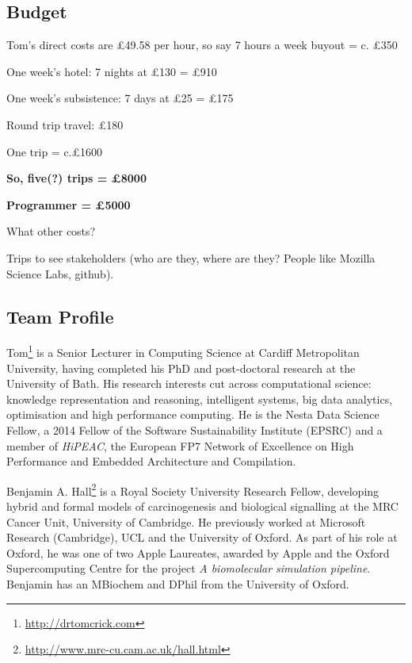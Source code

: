 \documentclass[a4paper,11pt]{article}
\begin{document}



\subsection*{Budget}

Tom's direct costs are \pounds 49.58 per hour, so say 7 hours a week
buyout = c. \pounds 350

One week's hotel: 7 nights at \pounds 130 = \pounds 910

One week's subsistence: 7 days at \pounds 25 = \pounds 175

Round trip travel: \pounds 180

One trip = c.£1600

{\textbf{So, five(?) trips = \pounds 8000}}

{\textbf{Programmer = \pounds 5000}}

What other costs?

Trips to see stakeholders (who are they, where are they? People like Mozilla Science Labs, github). 

\subsection*{Team Profile}

Tom\footnote{\url{http://drtomcrick.com}} is a Senior Lecturer in
Computing Science at Cardiff Metropolitan University, having completed
his PhD and post-doctoral research at the University of Bath. His
research interests cut across computational science: knowledge
representation and reasoning, intelligent systems, big data analytics,
optimisation and high performance computing.  He is the Nesta Data
Science Fellow, a 2014 Fellow of the Software Sustainability Institute
(EPSRC) and a member of {\emph{HiPEAC}}, the European FP7 Network of
Excellence on High Performance and Embedded Architecture and
Compilation.

Benjamin A. Hall\footnote{\url{http://www.mrc-cu.cam.ac.uk/hall.html}}
is a Royal Society University Research Fellow, developing hybrid and
formal models of carcinogenesis and biological signalling at the MRC
Cancer Unit, University of Cambridge. He previously worked at
Microsoft Research (Cambridge), UCL and the University of Oxford. As
part of his role at Oxford, he was one of two Apple
Laureates, awarded by Apple and the Oxford Supercomputing Centre for
the project {\emph{A biomolecular simulation pipeline}}. Benjamin has an
MBiochem and DPhil from the University of Oxford.
\end{document}
